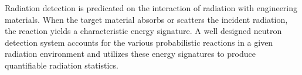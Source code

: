 \documentclass[../../../../main.tex]{subfiles}
\begin{document}
    \Xsubsubsection%
    Radiation detection is predicated on the interaction of radiation with engineering materials.
    When the target material absorbs or scatters the incident radiation, the reaction yields a characteristic energy signature.
    A well designed neutron detection system accounts for the various probabilistic reactions in a given radiation environment and utilizes these energy signatures to produce quantifiable radiation statistics. 
\end{document}
